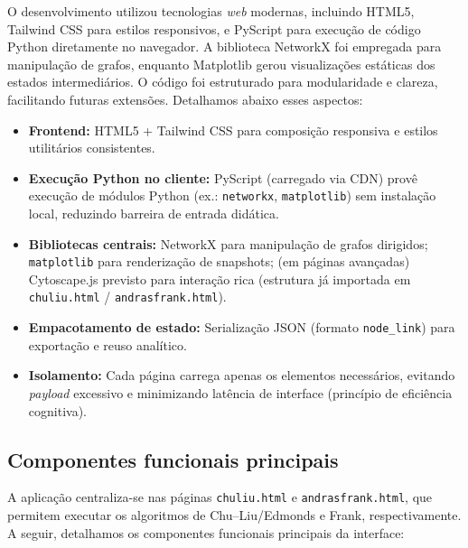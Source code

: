 O desenvolvimento utilizou tecnologias \textit{web} modernas, incluindo HTML5, Tailwind CSS para estilos responsivos, e PyScript para execução de código Python diretamente no navegador. A biblioteca NetworkX foi empregada para manipulação de grafos, enquanto Matplotlib gerou visualizações estáticas dos estados intermediários. O código foi estruturado para modularidade e clareza, facilitando futuras extensões. Detalhamos abaixo esses aspectos:

\begin{itemize}\setlength{\itemsep}{2pt}
	\item \textbf{Frontend:} HTML5 + Tailwind CSS para composição responsiva e estilos utilitários consistentes.
	\item \textbf{Execução Python no cliente:} PyScript (carregado via CDN) provê execução de módulos Python (ex.: \texttt{networkx}, \texttt{matplotlib}) sem instalação local, reduzindo barreira de entrada didática.
	\item \textbf{Bibliotecas centrais:} NetworkX para manipulação de grafos dirigidos; \texttt{matplotlib} para renderização de snapshots; (em páginas avançadas) Cytoscape.js previsto para interação rica (estrutura já importada em \texttt{chuliu.html} / \texttt{andrasfrank.html}).
	\item \textbf{Empacotamento de estado:} Serialização JSON (formato \texttt{node\_link}) para exportação e reuso analítico.
	\item \textbf{Isolamento:} Cada página carrega apenas os elementos necessários, evitando \emph{payload} excessivo e minimizando latência de interface (princípio de eficiência cognitiva).
\end{itemize}

\subsection{Componentes funcionais principais}

A aplicação centraliza-se nas páginas \texttt{chuliu.html} e \texttt{andrasfrank.html}, que permitem executar os algoritmos de Chu--Liu/Edmonds e Frank, respectivamente. A seguir, detalhamos os componentes funcionais principais da interface:

